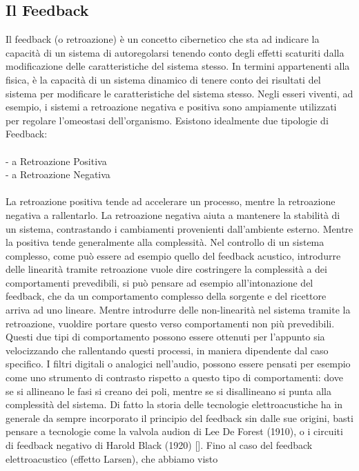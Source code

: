 \subsection{Il Feedback}
\label{sec:Il Feedback}
Il feedback (o retroazione) è un concetto cibernetico che sta ad indicare
la capacità di un sistema di autoregolarsi tenendo conto degli effetti scaturiti
dalla modificazione delle caratteristiche del sistema stesso.
In termini appartenenti alla fisica, è la capacità di un sistema dinamico
di tenere conto dei risultati del sistema per
modificare le caratteristiche del sistema stesso.
Negli esseri viventi, ad esempio, i sistemi a retroazione negativa e positiva
sono ampiamente utilizzati per regolare l'omeostasi dell'organismo.
Esistono idealmente due tipologie di Feedback:
\\ \\
- a Retroazione Positiva
\\
- a Retroazione Negativa
\\ \\
La retroazione positiva tende ad accelerare un processo,
mentre la retroazione negativa a rallentarlo.
La retroazione negativa aiuta a mantenere la stabilità di un sistema,
contrastando i cambiamenti provenienti dall'ambiente esterno.
Mentre la positiva tende generalmente alla complessità.
Nel controllo di un sistema complesso,
come può essere ad esempio quello del feedback acustico,
introdurre delle linearità tramite retroazione
vuole dire costringere la complessità
a dei comportamenti prevedibili, si può pensare ad esempio
all'intonazione del feedback,
che da un comportamento complesso della sorgente e del ricettore arriva
ad uno lineare.
Mentre introdurre delle non-linearità nel sistema tramite la retroazione,
vuoldire portare questo verso comportamenti non più prevedibili.
Questi due tipi di comportamento possono essere ottenuti per l'appunto
sia velocizzando che rallentando questi processi,
in maniera dipendente dal caso specifico.
I filtri digitali o analogici nell'audio,
possono essere pensati per esempio come uno strumento
di contrasto rispetto a questo tipo di comportamenti:
dove se si allineano le fasi si creano dei poli,
mentre se si disallineano si punta alla complessità del sistema.
Di fatto la storia delle tecnologie elettroacustiche ha in generale
da sempre incorporato il principio
del feedback sin dalle sue origini, basti pensare a tecnologie
come la valvola audion di Lee De Forest (1910),
o i circuiti di feedback negativo di Harold Black (1920) [\cite{echodiscipio}].
Fino al caso del feedback elettroacustico (effetto Larsen), che abbiamo visto

